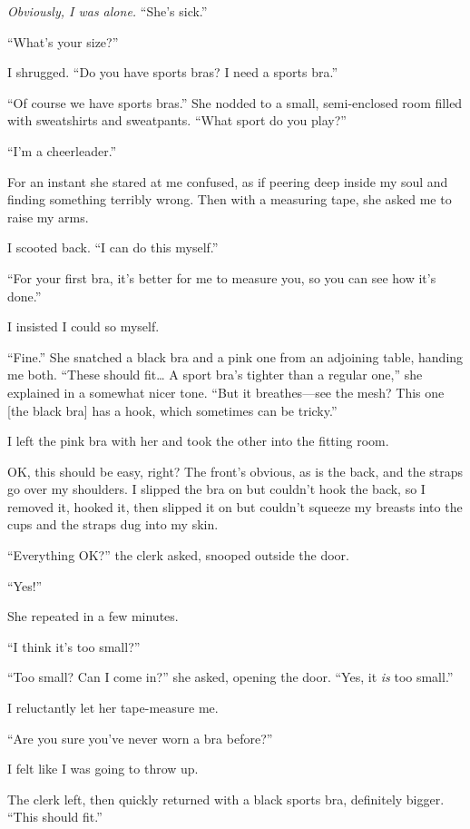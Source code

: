 \emph{Obviously, I was alone.} ``She's sick.''

``What's your size?''

I shrugged. ``Do you have sports bras? I need a sports bra.''

``Of course we have sports bras.'' She nodded to a small, semi-enclosed
room filled with sweatshirts and sweatpants. ``What sport do you play?''

``I'm a cheerleader.''

For an instant she stared at me confused, as if peering deep inside my
soul and finding something terribly wrong. Then with a measuring tape,
she asked me to raise my arms.

I scooted back. ``I can do this myself.''

``For your first bra, it's better for me to measure you, so you can see
how it's done.''

I insisted I could so myself.

``Fine.'' She snatched a black bra and a pink one from an adjoining
table, handing me both. ``These should fit\ldots{} A sport bra's tighter
than a regular one,'' she explained in a somewhat nicer tone. ``But it
breathes---see the mesh? This one {[}the black bra{]} has a hook, which
sometimes can be tricky.''

I left the pink bra with her and took the other into the fitting room.

OK, this should be easy, right? The front's obvious, as is the back, and
the straps go over my shoulders. I slipped the bra on but couldn't hook
the back, so I removed it, hooked it, then slipped it on but couldn't
squeeze my breasts into the cups and the straps dug into my skin.

``Everything OK?'' the clerk asked, snooped outside the door.

``Yes!''

She repeated in a few minutes.

``I think it's too small?''

``Too small? Can I come in?'' she asked, opening the door. ``Yes, it
\emph{is} too small.''

I reluctantly let her tape-measure me.

``Are you sure you've never worn a bra before?''

I felt like I was going to throw up.

The clerk left, then quickly returned with a black sports bra,
definitely bigger. ``This should fit.''

